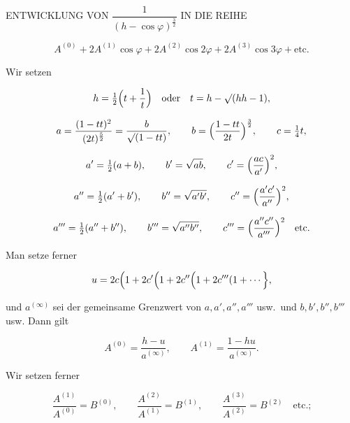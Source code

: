 \clearpage
{}%

\begin{center}
\large ENTWICKLUNG VON $\dfrac{1}{(h-\cos\varphi)^{\frac{3}{2}}}$ IN DIE REIHE
\end{center}

\[
A^{(0)}+2A^{(1)}\cos\varphi+2A^{(2)}\cos2\varphi+2A^{(3)}\cos3\varphi+\text{etc.}
\]

Wir setzen

\[
h=\tfrac{1}{2}\Bigl(t+\frac{1}{t}\Bigr)\quad\text{oder}\quad t=h-\mathord{\surd}(hh-1),
\]

\[
a=\frac{(1-tt)^2}{(2t)^{\frac{5}{2}}}=\frac{b}{\mathord{\surd}(1-tt)},\qquad
b=\Bigl(\frac{1-tt}{2t}\Bigr)^{\frac{3}{2}},\qquad
c=\tfrac{1}{4}t,
\]

\[
a'=\tfrac{1}{2}(a+b),\qquad b'=\sqrt{ab},\qquad c'=\Bigl(\frac{ac}{a'}\Bigr)^{2},
\]

\[
a''=\tfrac{1}{2}(a'+b'),\qquad b''=\sqrt{a'b'},\qquad c''=\Bigl(\frac{a'c'}{a''}\Bigr)^{2},
\]

\[
a'''=\tfrac{1}{2}(a''+b''),\qquad b'''=\sqrt{a''b''},\qquad c'''=\Bigl(\frac{a''c''}{a'''}\Bigr)^{2}\quad\text{etc.}
\]

Man setze ferner

\[
u=2c\Bigl(1+2c'\Bigl(1+2c''\Bigl(1+2c'''(1+\cdots\Bigr\},
\]

\noindent und $a^{(\infty)}$ sei der gemeinsame Grenzwert von $a,a',a'',a'''$ usw.\ und
$b,b',b'',b'''$ usw. Dann gilt

\[
A^{(0)}=\frac{h-u}{a^{(\infty)}},\qquad A^{(1)}=\frac{1-hu}{a^{(\infty)}}.
\]

Wir setzen ferner

\[
\frac{A^{(1)}}{A^{(0)}}=B^{(0)},\qquad
\frac{A^{(2)}}{A^{(1)}}=B^{(1)},\qquad
\frac{A^{(3)}}{A^{(2)}}=B^{(2)}\quad\text{etc.;}
\]
